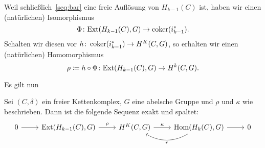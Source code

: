 \begin{vorbereitung}
  Weil schließlich~\eqref{seq:bar} eine freie Auflösung von $H_{k-1}(C)$ ist, haben wir einen (natürlichen) Isomorphismus
  \begin{equation*}
    \Phi\colon \mathrm{Ext}(H_{k-1}(C),G) \to \operatorname{coker}(i_{k-1}^*).
  \end{equation*}
  Schalten wir diesen vor $h \colon \operatorname{coker}(i_{k-1}^*) \to H^K(C,G)$, so erhalten wir einen (natürlichen) Homomorphismus
  \begin{equation*}
    \rho \coloneqq h \circ \Phi \colon \mathrm{Ext}(H_{k-1}(C),G) \to H^k(C,G).
  \end{equation*}
\end{vorbereitung}
Es gilt nun
\begin{satz}
  Sei $(C,\delta)$ ein freier Kettenkomplex, $G$ eine abelsche Gruppe und $\rho$ und $\kappa$ wie beschrieben.
  Dann ist die folgende Sequenz exakt und spaltet:
  \begin{equation*}
    \begin{tikzcd}
      0 \arrow{r}{}
      & \Ext(H_{k-1}(C),G) \arrow{r}{\rho}
      & H^K(C,G) \arrow{r}{\kappa}
      & \Hom(H_k(C), G) \arrow{r}{} \arrow[bend left]{l}{r}
      & 0
    \end{tikzcd}
  \end{equation*}
\end{satz}
